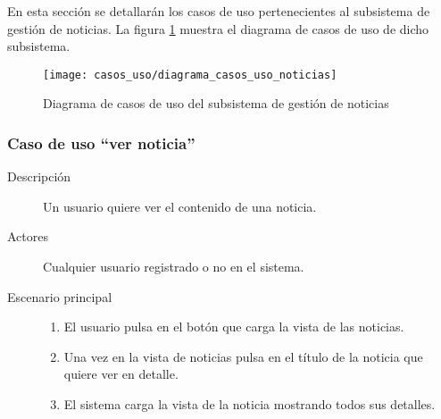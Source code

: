 En esta sección se detallarán los casos de uso pertenecientes al subsistema de gestión de noticias. La figura \ref{fig:casos_uso_subsistema_noticias} muestra el diagrama de casos de uso de dicho subsistema.

\begin{figure}[h]
\centering
\texttt{[image: casos\_uso/diagrama\_casos\_uso\_noticias]}
\caption{Diagrama de casos de uso del subsistema de gestión de noticias}
\label{fig:casos_uso_subsistema_noticias}
\end{figure}


\subsubsection{Caso de uso ``ver noticia''}
\begin{description}
\item[Descripción] Un usuario quiere ver el contenido de una noticia.
\item[Actores] Cualquier usuario registrado o no en el sistema.
\item[Escenario principal] 	\hfill
							\begin{enumerate}
							\item El usuario pulsa en el botón que carga la vista de las noticias.
							\item Una vez en la vista de noticias pulsa en el título de la noticia que quiere ver en detalle.
							\item El sistema carga la vista de la noticia mostrando todos sus detalles.
							\end{enumerate}
\end{description}



